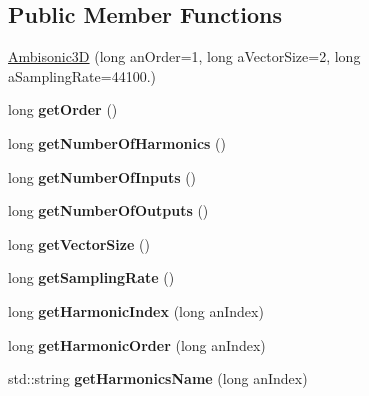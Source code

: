 \subsection*{Public Member Functions}
\begin{DoxyCompactItemize}
\item 
\hyperlink{class_ambisonic3_d_aa0948430277ba494551bb712f7a548ea}{Ambisonic3\-D} (long an\-Order=1, long a\-Vector\-Size=2, long a\-Sampling\-Rate=44100.)
\item 
\hypertarget{class_ambisonic3_d_a122f538beab6cecd937494795d9fea68}{long {\bfseries get\-Order} ()}\label{class_ambisonic3_d_a122f538beab6cecd937494795d9fea68}

\item 
\hypertarget{class_ambisonic3_d_a0def8cb523b6f09d704bb78c7104ff6d}{long {\bfseries get\-Number\-Of\-Harmonics} ()}\label{class_ambisonic3_d_a0def8cb523b6f09d704bb78c7104ff6d}

\item 
\hypertarget{class_ambisonic3_d_ad6729e3265d85ebbca09c8dc7b88ae0a}{long {\bfseries get\-Number\-Of\-Inputs} ()}\label{class_ambisonic3_d_ad6729e3265d85ebbca09c8dc7b88ae0a}

\item 
\hypertarget{class_ambisonic3_d_a7c94c05cb033a8f84ae5a92b20896c25}{long {\bfseries get\-Number\-Of\-Outputs} ()}\label{class_ambisonic3_d_a7c94c05cb033a8f84ae5a92b20896c25}

\item 
\hypertarget{class_ambisonic3_d_aa3dfa779bd5934d617fc2cc087421928}{long {\bfseries get\-Vector\-Size} ()}\label{class_ambisonic3_d_aa3dfa779bd5934d617fc2cc087421928}

\item 
\hypertarget{class_ambisonic3_d_afd6071ee65babdcf2ba6f10b5b5fefe0}{long {\bfseries get\-Sampling\-Rate} ()}\label{class_ambisonic3_d_afd6071ee65babdcf2ba6f10b5b5fefe0}

\item 
\hypertarget{class_ambisonic3_d_acff0f5e46b5a7c6de7856956bda1e1a0}{long {\bfseries get\-Harmonic\-Index} (long an\-Index)}\label{class_ambisonic3_d_acff0f5e46b5a7c6de7856956bda1e1a0}

\item 
\hypertarget{class_ambisonic3_d_adcd251db6df904e4cab3e464e19c3a08}{long {\bfseries get\-Harmonic\-Order} (long an\-Index)}\label{class_ambisonic3_d_adcd251db6df904e4cab3e464e19c3a08}

\item 
\hypertarget{class_ambisonic3_d_a77d9738670b3a3224dd622f01eb65689}{std\-::string {\bfseries get\-Harmonics\-Name} (long an\-Index)}\label{class_ambisonic3_d_a77d9738670b3a3224dd622f01eb65689}


\end{DoxyCompactItemize}
